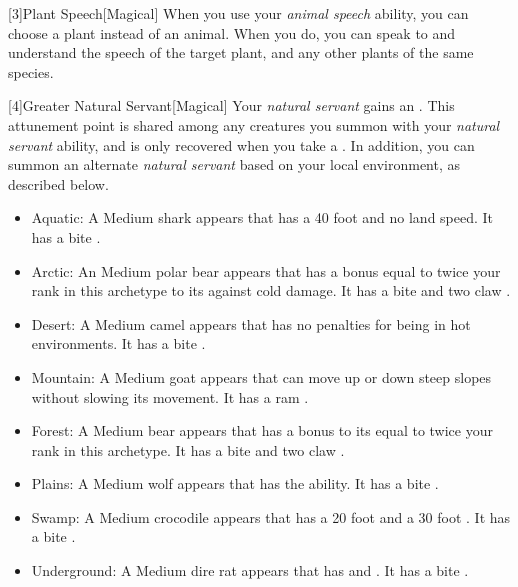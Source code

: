         [3]{Plant Speech}[Magical] When you use your \textit{animal speech} ability, you can choose a plant instead of an animal.
        When you do, you can speak to and understand the speech of the target plant, and any other plants of the same species.

        [4]{Greater Natural Servant}[Magical] Your \textit{natural servant} gains an .
        This attunement point is shared among any creatures you summon with your \textit{natural servant} ability, and is only recovered when you take a .
        In addition, you can summon an alternate \textit{natural servant} based on your local environment, as described below.
        \begin{itemize}
            \item Aquatic: A Medium shark appears that has a 40 foot  and no land speed.
                It has a bite .
            \item Arctic: An Medium polar bear appears that has a bonus equal to twice your rank in this archetype to its  against cold damage.
                It has a bite  and two claw .
            \item Desert: A Medium camel appears that has no penalties for being in hot environments.
                It has a bite .
            \item Mountain: A Medium goat appears that can move up or down steep slopes without slowing its movement.
                It has a ram .
            \item Forest: A Medium bear appears that has a bonus to its  equal to twice your rank in this archetype.
                It has a bite  and two claw .
            \item Plains: A Medium wolf appears that has the  ability.
                It has a bite .
            \item Swamp: A Medium crocodile appears that has a 20 foot  and a 30 foot .
                It has a bite .
            \item Underground: A Medium dire rat appears that has  and .
                It has a bite .
        \end{itemize}

